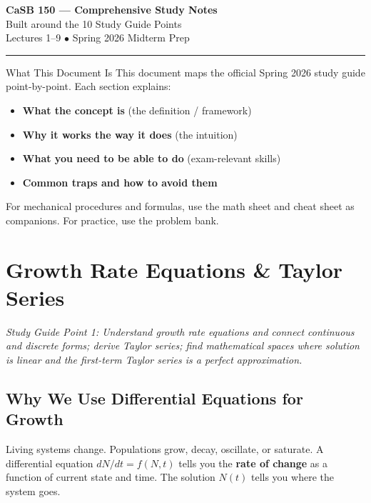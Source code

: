 \documentclass[11pt]{article}
\begin{document}
\begin{center}
  {\LARGE\textbf{CaSB 150 --- Comprehensive Study Notes}}\\[5pt]
  {\large Built around the 10 Study Guide Points}\\[3pt]
  {\small Lectures 1--9 $\bullet$ Spring 2026 Midterm Prep}
\end{center}
\hrule\vspace{8pt}

\begin{conceptbox}{What This Document Is}
This document maps the official Spring 2026 study guide point-by-point. Each section explains:
\begin{itemize}
\item \textbf{What the concept is} (the definition / framework)
\item \textbf{Why it works the way it does} (the intuition)
\item \textbf{What you need to be able to do} (exam-relevant skills)
\item \textbf{Common traps and how to avoid them}
\end{itemize}
For mechanical procedures and formulas, use the math sheet and cheat sheet as companions. For practice, use the problem bank.
\end{conceptbox}

\tableofcontents
\newpage

\section{Growth Rate Equations \& Taylor Series}

\textit{Study Guide Point 1: Understand growth rate equations and connect continuous and discrete forms; derive Taylor series; find mathematical spaces where solution is linear and the first-term Taylor series is a perfect approximation.}

\subsection{Why We Use Differential Equations for Growth}

Living systems change. Populations grow, decay, oscillate, or saturate. A differential equation $dN/dt = f(N, t)$ tells you the \textbf{rate of change} as a function of current state and time. The solution $N(t)$ tells you where the system goes.
\end{document}
